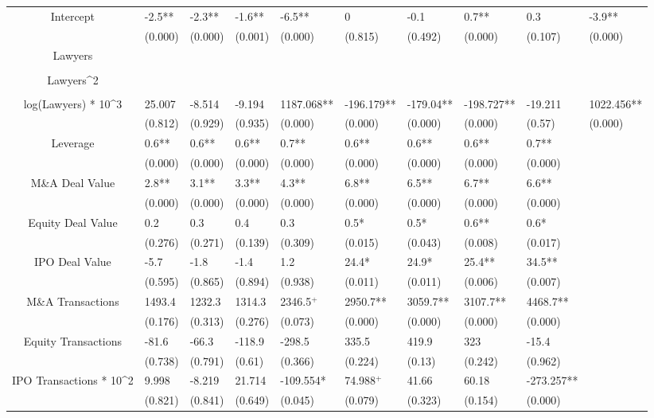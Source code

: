 \documentclass{article}
\begin{document}
\begin{table}[H]
\begin{tabular}{|clllllllll|}
Intercept & -2.5** & -2.3** & -1.6** & -6.5** & 0 & -0.1 & 0.7** & 0.3 & -3.9** \\ 
   & (0.000) & (0.000) & (0.001) & (0.000) & (0.815) & (0.492) & (0.000) & (0.107) & (0.000) \\ 
  Lawyers &  &  &  &  &  &  &  &  &  \\ 
   &  &  &  &  &  &  &  &  &  \\ 
  Lawyers^2 &  &  &  &  &  &  &  &  &  \\ 
   &  &  &  &  &  &  &  &  &  \\ 
  log(Lawyers) * 10^3 & 25.007 & -8.514 & -9.194 & 1187.068** & -196.179** & -179.04** & -198.727** & -19.211 & 1022.456** \\ 
   & (0.812) & (0.929) & (0.935) & (0.000) & (0.000) & (0.000) & (0.000) & (0.57) & (0.000) \\ 
  Leverage & 0.6** & 0.6** & 0.6** & 0.7** & 0.6** & 0.6** & 0.6** & 0.7** &  \\ 
   & (0.000) & (0.000) & (0.000) & (0.000) & (0.000) & (0.000) & (0.000) & (0.000) &  \\ 
  M\&A Deal Value & 2.8** & 3.1** & 3.3** & 4.3** & 6.8** & 6.5** & 6.7** & 6.6** &  \\ 
   & (0.000) & (0.000) & (0.000) & (0.000) & (0.000) & (0.000) & (0.000) & (0.000) &  \\ 
  Equity Deal Value & 0.2 & 0.3 & 0.4 & 0.3 & 0.5* & 0.5* & 0.6** & 0.6* &  \\ 
   & (0.276) & (0.271) & (0.139) & (0.309) & (0.015) & (0.043) & (0.008) & (0.017) &  \\ 
  IPO Deal Value & -5.7 & -1.8 & -1.4 & 1.2 & 24.4* & 24.9* & 25.4** & 34.5** &  \\ 
   & (0.595) & (0.865) & (0.894) & (0.938) & (0.011) & (0.011) & (0.006) & (0.007) &  \\ 
  M\&A Transactions & 1493.4 & 1232.3 & 1314.3 & 2346.5$^{+}$ & 2950.7** & 3059.7** & 3107.7** & 4468.7** &  \\ 
   & (0.176) & (0.313) & (0.276) & (0.073) & (0.000) & (0.000) & (0.000) & (0.000) &  \\ 
  Equity Transactions & -81.6 & -66.3 & -118.9 & -298.5 & 335.5 & 419.9 & 323 & -15.4 &  \\ 
   & (0.738) & (0.791) & (0.61) & (0.366) & (0.224) & (0.13) & (0.242) & (0.962) &  \\ 
  IPO Transactions * 10^2 & 9.998 & -8.219 & 21.714 & -109.554* & 74.988$^{+}$ & 41.66 & 60.18 & -273.257** &  \\ 
   & (0.821) & (0.841) & (0.649) & (0.045) & (0.079) & (0.323) & (0.154) & (0.000) &  \\ 

\end{tabular}
\end{table}
\end{document}
